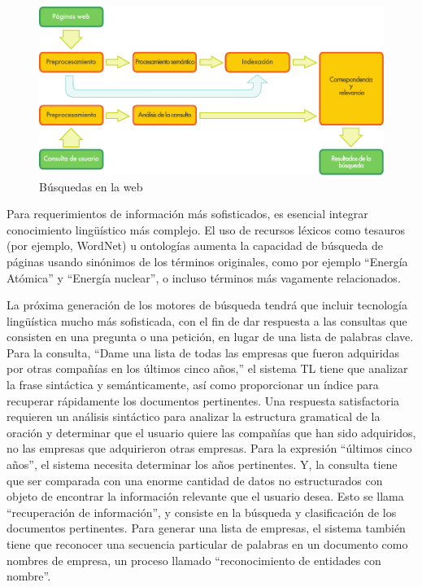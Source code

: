 \begin{multicols}{2}
\begin{figure}[htb]
  \center
  \includegraphics[width=\textwidth]{../_media/spanish/web_search_architecture}
  \caption{Búsquedas en la web}
  \label{fig:websearcharch_de}
\end{figure}

Para requerimientos de información más sofisticados, es esencial  integrar conocimiento lingüístico más complejo. El uso de recursos léxicos como tesauros (por ejemplo, WordNet) u ontologías aumenta la capacidad de búsqueda de páginas usando sinónimos de los términos originales, como por ejemplo "`Energía Atómica"' y "`Energía nuclear"', o incluso términos más vagamente relacionados.

La próxima generación de los motores de búsqueda tendrá que incluir tecnología lingüística mucho más sofisticada, con el fin de dar respuesta a las consultas que consisten en una pregunta o una petición, en lugar de una lista de palabras clave. Para la consulta, "`Dame una lista de todas las empresas que fueron adquiridas por otras compañías en los últimos cinco años,"' el sistema TL tiene que analizar la frase sintáctica y semánticamente, así como proporcionar un índice para recuperar rápidamente los documentos pertinentes. Una respuesta satisfactoria requieren un análisis sintáctico para analizar la estructura gramatical de la oración y determinar que el usuario quiere las compañías que han sido adquiridos, no las empresas que adquirieron otras empresas. Para la expresión “últimos cinco años”, el sistema necesita determinar los años pertinentes. Y, la consulta tiene que ser comparada con una enorme cantidad de datos no estructurados con objeto de encontrar la información relevante que el usuario desea. Esto se llama "`recuperación de información"', y consiste en la búsqueda y clasificación de los documentos pertinentes. Para generar una lista de empresas, el sistema también tiene que reconocer una secuencia particular de  palabras en un documento como nombres de empresa, un proceso llamado "`reconocimiento de entidades con nombre"'.


\end{multicols}

